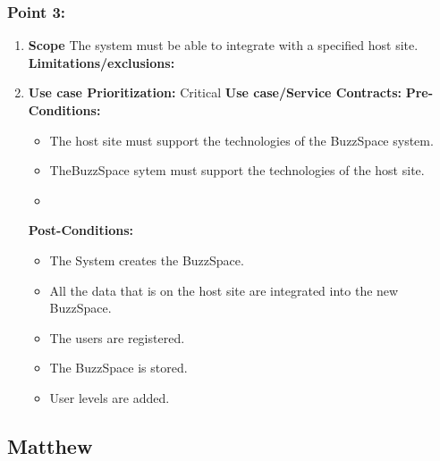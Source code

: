 \documentclass[11pt]{article}
\begin{document}
\subsubsection{Point 3:}
\begin{enumerate}
\item 
\textbf{Scope}
The system must be able to integrate with a specified host site.
\newline
\textbf{Limitations/exclusions:}
\item
\textbf{Use case Prioritization:} Critical
\textbf{Use case/Service Contracts:} 
\newline
\textbf{Pre-Conditions: }
\begin{itemize}
\item The host site must support the technologies of the BuzzSpace system.
\item TheBuzzSpace sytem must support the technologies of the host site.
\item 
\end{itemize}
 \textbf{Post-Conditions: }
\begin{itemize}
\item The System creates the BuzzSpace.
\item All the data that is on the host site are integrated into the new BuzzSpace.
\item The users are registered.
\item The BuzzSpace is stored.
\item User levels are added.

\end{itemize}
\end{enumerate}


\subsection{Matthew}
\end{document}
